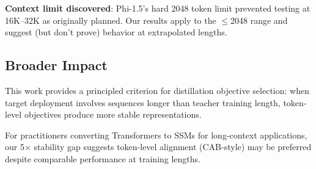 \textbf{Context limit discovered}: Phi-1.5's hard 2048 token limit prevented testing at 16K--32K as originally planned. Our results apply to the $\leq$2048 range and suggest (but don't prove) behavior at extrapolated lengths.

\subsection{Broader Impact}

This work provides a principled criterion for distillation objective selection: when target deployment involves sequences longer than teacher training length, token-level objectives produce more stable representations.

For practitioners converting Transformers to SSMs for long-context applications, our 5$\times$ stability gap suggests token-level alignment (CAB-style) may be preferred despite comparable performance at training lengths.
